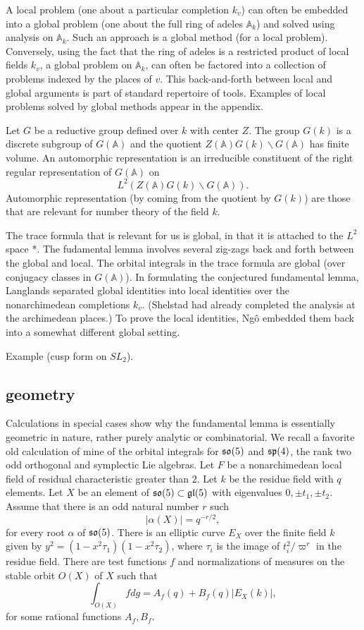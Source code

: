 \documentclass[brochure,english,12pt]{bourbaki}
\newcommand{\ring}[1]{\mathbb{#1}}
\def\A{\ring{A}}
\def\so{\frak{so}}
\def\sp{\frak{sp}}
\def\gl{\frak{gl}}
\begin{document}
A local problem (one about a particular completion $k_v$) can often be
embedded into a global problem (one about the full ring of adeles
$\A_k$) and solved using analysis on $\A_k$.  Such an approach is a
global method (for a local problem).  Conversely, using the fact that
the ring of adeles is a restricted product of local fields $k_v$, a
global problem on $\A_k$, can often be factored into a collection of
problems indexed by the places of $v$.  This back-and-forth between
local and global arguments is part of standard repertoire of tools.
Examples of local problems solved by global methods appear in the
appendix.


Let $G$ be a reductive group defined over $k$ with center $Z$.  The
group $G(k)$ is a discrete subgroup of $G(\A)$ and the quotient
$Z(\A)G(k)\backslash G(\A)$ has finite volume.  An automorphic
representation is an irreducible constituent of the right regular
representation of $G(\A)$ on 
\[
L^2(Z(\A) G(k)\backslash G(\A)).
\]
Automorphic representation (by coming from the quotient by $G(k)$) are
those that are relevant for number theory of the field $k$.

The trace formula that is relevant for us is global, in that it is
attached to the $L^2$ space *.  The fudamental lemma involves several
zig-zags back and forth between the global and local.  The orbital
integrals in the trace formula are global (over conjugacy classes in
$G(\A)$).  In formulating the conjectured fundamental lemma, Langlands
separated global identities into local identities over the
nonarchimedean completions $k_v$.  (Shelstad had already completed the
analysis at the archimedean places.)  To prove the local identities,
Ng\^o embedded them back into a somewhat different global setting.

Example (cusp form on $SL_2$).


\subsection{geometry}

Calculations in special cases show why
the fundamental lemma is essentially geometric in nature, rather purely analytic
or combinatorial. We recall a favorite old calculation of mine
of the orbital integrals for $\so(5)$ and $\sp(4)$, the rank two odd orthogonal
and symplectic Lie algebras.  Let $F$ be a
nonarchimedean local field of residual characteristic greater than
$2$.  Let $k$ be the residue field with $q$ elements.  Let $X$ be an
element of $\so(5)\subset \gl(5)$ with eigenvalues $0,\pm t_1,\pm
t_2$.  Assume that there is an odd natural number $r$ such
\[
|\alpha(X)| = q^{-r/2},
\]
for every root $\alpha$ of $\so(5)$. 
There is an elliptic curve $E_X$ over the finite field $k$ given by
$y^2 = (1-x^2\tau_1)(1-x^2\tau_2)$, where $\tau_i$ is the image
of $t_i^2/\varpi^r$ in the residue field.  There are test functions $f$ and normalizations of
measures on the stable orbit $O(X)$ of $X$ such that
\begin{equation}\label{eqn:elliptic}
\int_{O(X)} f dg = A_f(q) + B_f(q) | E_X(k)|,
\end{equation}
for some rational functions $A_f,B_f$.
\end{document}
